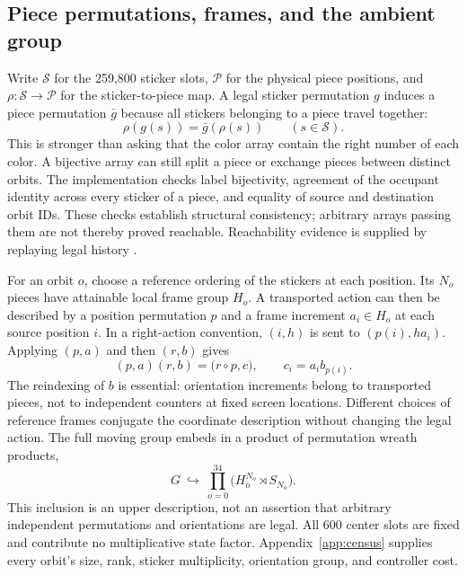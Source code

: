 \documentclass[a4paper,11pt]{article}
\begin{document}
\subsection{Piece permutations, frames, and the ambient group}

Write \(\mathcal S\) for the 259,800 sticker slots, \(\mathcal P\) for the physical piece positions, and \(\rho:\mathcal S\to\mathcal P\) for the sticker-to-piece map. A legal sticker permutation \(g\) induces a piece permutation \(\bar g\) because all stickers belonging to a piece travel together:
\begin{equation}
\rho(g(s))=\bar g(\rho(s))\qquad(s\in\mathcal S).
\label{eq:piece-equivariance}
\end{equation}
This is stronger than asking that the color array contain the right number of each color. A bijective array can still split a piece or exchange pieces between distinct orbits. The implementation checks label bijectivity, agreement of the occupant identity across every sticker of a piece, and equality of source and destination orbit IDs. These checks establish structural consistency; arbitrary arrays passing them are not thereby proved reachable. Reachability evidence is supplied by replaying legal history \cite{sourcecode}.

For an orbit \(o\), choose a reference ordering of the stickers at each position. Its \(N_o\) pieces have attainable local frame group \(H_o\). A transported action can then be described by a position permutation \(p\) and a frame increment \(a_i\in H_o\) at each source position \(i\). In a right-action convention, \((i,h)\) is sent to \((p(i),ha_i)\). Applying \((p,a)\) and then \((r,b)\) gives
\begin{equation}
(p,a)(r,b)=\bigl(r\circ p,c\bigr),\qquad c_i=a_i b_{p(i)}.
\label{eq:wreath-law}
\end{equation}
The reindexing of \(b\) is essential: orientation increments belong to transported pieces, not to independent counters at fixed screen locations. Different choices of reference frames conjugate the coordinate description without changing the legal action. The full moving group embeds in a product of permutation wreath products,
\begin{equation}
G\ \hookrightarrow\ \prod_{o=0}^{34}\bigl(H_o^{N_o}\rtimes S_{N_o}\bigr).
\label{eq:ambient-group}
\end{equation}
This inclusion is an upper description, not an assertion that arbitrary independent permutations and orientations are legal. All 600 center slots are fixed and contribute no multiplicative state factor. Appendix~\ref{app:census} supplies every orbit's size, rank, sticker multiplicity, orientation group, and controller cost.
\end{document}
